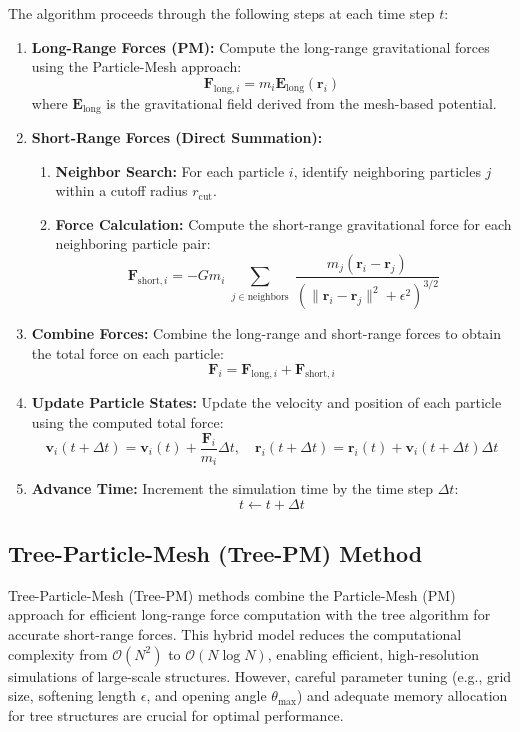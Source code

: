The algorithm proceeds through the following steps at each time step $t$:

\begin{enumerate}
    \item \textbf{Long-Range Forces (PM):}
    Compute the long-range gravitational forces using the Particle-Mesh approach:
    \[
    \mathbf{F}_{\text{long},i} = m_i \mathbf{E}_{\text{long}}(\mathbf{r}_i)
    \]
    where $\mathbf{E}_{\text{long}}$ is the gravitational field derived from the mesh-based potential.
    
    \item \textbf{Short-Range Forces (Direct Summation):}
    \begin{enumerate}[label={(\alph*)}]
        \item \textbf{Neighbor Search:}
        For each particle $i$, identify neighboring particles $j$ within a cutoff radius $r_{\text{cut}}$.
        
        \item \textbf{Force Calculation:}
        Compute the short-range gravitational force for each neighboring particle pair:
        \[
        \mathbf{F}_{\text{short},i} = -G m_i \sum_{\substack{j \in \text{neighbors}}} \frac{m_j (\mathbf{r}_i - \mathbf{r}_j)}{\left(\|\mathbf{r}_i - \mathbf{r}_j\|^2 + \epsilon^2\right)^{3/2}}
        \]
    \end{enumerate}
    
    \item \textbf{Combine Forces:}
    Combine the long-range and short-range forces to obtain the total force on each particle:
    \[
    \mathbf{F}_i = \mathbf{F}_{\text{long},i} + \mathbf{F}_{\text{short},i}
    \]
    
    \item \textbf{Update Particle States:}
    Update the velocity and position of each particle using the computed total force:
    \[
    \mathbf{v}_i(t + \Delta t) = \mathbf{v}_i(t) + \frac{\mathbf{F}_i}{m_i} \Delta t, \quad \mathbf{r}_i(t + \Delta t) = \mathbf{r}_i(t) + \mathbf{v}_i(t + \Delta t) \Delta t
    \]
    
    \item \textbf{Advance Time:}
    Increment the simulation time by the time step $\Delta t$:
    \[
    t \leftarrow t + \Delta t
    \]
\end{enumerate}

\subsection{Tree-Particle-Mesh (Tree-PM) Method}
Tree-Particle-Mesh (Tree-PM) methods combine the Particle-Mesh (PM) approach for efficient long-range force computation with the tree algorithm for accurate short-range forces. This hybrid model reduces the computational complexity from $\mathcal{O}(N^2)$ to $\mathcal{O}(N \log N)$, enabling efficient, high-resolution simulations of large-scale structures. However, careful parameter tuning (e.g., grid size, softening length $\epsilon$, and opening angle $\theta_{\text{max}}$) and adequate memory allocation for tree structures are crucial for optimal performance.

